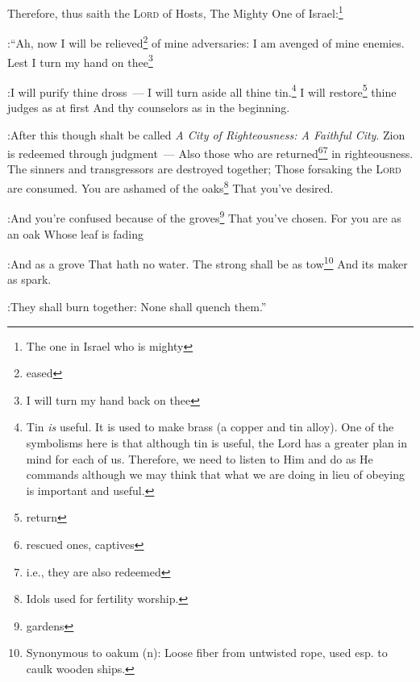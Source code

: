 \begin{inparaenum}
     Therefore, thus saith the \textsc{Lord} of Hosts, The Mighty One of Israel:\footnote{The one in Israel who is mighty}%

:``Ah, now I will be relieved\footnote{eased} of mine adversaries: I am avenged of mine enemies.%
     Lest I turn my hand on thee\footnote{I will turn my hand back on thee}%

:I will purify thine dross~--- I will turn aside all thine tin.\footnote{Tin \emph{is} useful. It is used to make brass (a copper and tin alloy). One of the symbolisms here is that although tin is useful, the Lord has a greater plan in mind for each of us. Therefore, we need to listen to Him and do as He commands although we may think that what we are doing in lieu of obeying is important and useful.}%
     I will restore\footnote{return} thine judges as at first And thy counselors as in the beginning.%

:After this though shalt be called \textit{A City of Righteousness: A Faithful City}.%
     Zion is redeemed through judgment~--- Also those who are returned\footnote{rescued ones, captives}\footnote{i.e., they are also redeemed} in righteousness.%
     The sinners and transgressors are destroyed together; Those forsaking the \textsc{Lord} are consumed.%
     You are ashamed of the oaks\footnote{Idols used for fertility worship.} That you've desired.%

:And you're confused because of the groves\footnote{gardens} That you've chosen.%
     For you are as an oak Whose leaf is fading%

:And as a grove That hath no water.%
     The strong shall be as tow\footnote{Synonymous to oakum (n): Loose fiber from untwisted rope, used esp. to caulk wooden ships.} And its maker as spark.%

:They shall burn together: None shall quench them.''%
\end{inparaenum}
